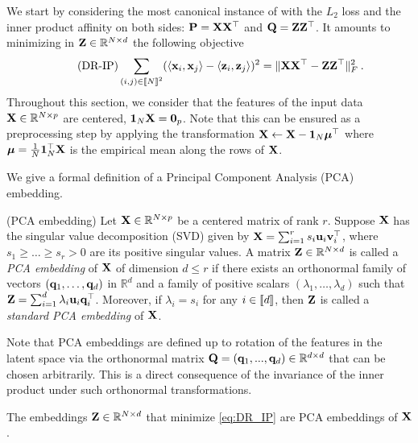We start by considering the most canonical instance of  with the $L_2$ loss and the inner product affinity on both sides: ${\mathbf{P}} = {\mathbf{X}} {\mathbf{X}}^\top$ and ${\mathbf{Q}} = {\mathbf{Z}} {\mathbf{Z}}^\top$. It amounts to minimizing in ${\mathbf{Z}} \in \mathbb{R}^{N \times d}$ the following objective
\begin{equation*}\label{eq:DR_IP}\tag{DR-IP}
	\sum_{(i,j) \in {[\![N]\!]}^2} (\langle {\mathbf{x}}_i, {\mathbf{x}}_j \rangle - \langle {\mathbf{z}}_i, {\mathbf{z}}_j \rangle)^2 = \| {\mathbf{X}} {\mathbf{X}}^\top - {\mathbf{Z}} {\mathbf{Z}}^\top \|_F^2 \:.
\end{equation*}
Throughout this section, we consider that the features of the input data ${\mathbf{X}} \in \mathbb{R}^{N \times p}$ are centered, \ie $\bm{1}_N {\mathbf{X}} = \bm{0}_p$. Note that this can be ensured as a preprocessing step by applying the transformation ${\mathbf{X}} \leftarrow {\mathbf{X}} - \bm{1}_N \bm{\mu}^\top$ where $\bm{\mu} = \frac{1}{N} \bm{1}_N^\top {\mathbf{X}}$ is the empirical mean along the rows of ${\mathbf{X}}$.

We give a formal definition of a Principal Component Analysis (PCA) embedding.
\begin{definition}{(PCA embedding)}\label{def:PCA_embedding}
	Let ${\mathbf{X}} \in \mathbb{R}^{N \times p}$ be a centered matrix of rank $r$. Suppose ${\mathbf{X}}$ has the singular value decomposition (SVD) given by ${\mathbf{X}} = \sum_{i=1}^{r} s_i {\mathbf{u}}_i {\mathbf{v}}_i^\top$, where $s_1 \geq \dots \geq s_r > 0$ are its positive singular values. A matrix ${\mathbf{Z}} \in \mathbb{R}^{N \times d}$ is called a \emph{PCA embedding} of ${\mathbf{X}}$ of dimension $d \leq r$ if there exists an orthonormal family of vectors $({\mathbf{q}}_1, \dots, {\mathbf{q}}_d)$ in $\mathbb{R}^d$ and a family of positive scalars $(\lambda_1, \dots, \lambda_d)$ such that ${\mathbf{Z}} = \sum_{i=1}^{d} \lambda_i {\mathbf{u}}_i {\mathbf{q}}_i^\top$. Moreover, if $\lambda_i = s_i$ for any $i \in {[\![d]\!]}$, then ${\mathbf{Z}}$ is called a \emph{standard PCA embedding} of ${\mathbf{X}}$.
\end{definition}
	
\begin{remark}
	Note that PCA embeddings are defined up to rotation of the features in the latent space via the orthonormal matrix ${\mathbf{Q}} = ({\mathbf{q}}_1, ..., {\mathbf{q}}_d) \in \mathbb{R}^{d \times d}$ that can be chosen arbitrarily. This is a direct consequence of the invariance of the inner product under such orthonormal transformations.
\end{remark}



\begin{proposition}\label{prop:PCA_embedding}
    The embeddings ${\mathbf{Z}} \in \mathbb{R}^{N \times d}$ that minimize \ref{eq:DR_IP} are PCA embeddings of ${\mathbf{X}}$.
\end{proposition}

